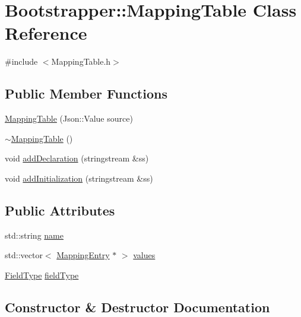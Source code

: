 \hypertarget{classBootstrapper_1_1MappingTable}{}\section{Bootstrapper\+:\+:Mapping\+Table Class Reference}
\label{classBootstrapper_1_1MappingTable}


{\ttfamily \#include $<$Mapping\+Table.\+h$>$}

\subsection*{Public Member Functions}
\begin{DoxyCompactItemize}
\item 
\hyperlink{classBootstrapper_1_1MappingTable_a8f7cb038c10f3123e0e29db7a974e29e}{Mapping\+Table} (Json\+::\+Value source)
\item 
\hyperlink{classBootstrapper_1_1MappingTable_a62950403dec2606ce8772c8305b006ed}{$\sim$\+Mapping\+Table} ()
\item 
void \hyperlink{classBootstrapper_1_1MappingTable_a81e665f9c02b9534720317e95743e1c9}{add\+Declaration} (stringstream \&ss)
\item 
void \hyperlink{classBootstrapper_1_1MappingTable_a2ab120f2cb5ed1dc93159ddc55264f19}{add\+Initialization} (stringstream \&ss)
\end{DoxyCompactItemize}
\subsection*{Public Attributes}
\begin{DoxyCompactItemize}
\item 
std\+::string \hyperlink{classBootstrapper_1_1MappingTable_aa1b11e86b77f9514cb067f6bf9ab5ef1}{name}
\item 
std\+::vector$<$ \hyperlink{classBootstrapper_1_1MappingEntry}{Mapping\+Entry} $\ast$ $>$ \hyperlink{classBootstrapper_1_1MappingTable_ad60b5c92cc19d1d31ed8012c22946fee}{values}
\item 
\hyperlink{namespaceBootstrapper_abb268c54c14e352b0204f5f0f928955f}{Field\+Type} \hyperlink{classBootstrapper_1_1MappingTable_aa433179b2b5409ee43d726554f260879}{field\+Type}
\end{DoxyCompactItemize}


\subsection{Constructor \& Destructor Documentation}
\hypertarget{classBootstrapper_1_1MappingTable_a8f7cb038c10f3123e0e29db7a974e29e}{}
